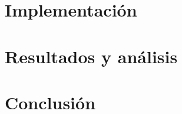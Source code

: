 \documentclass[12pt,a4]{article} %
\begin{document}
\begin{multicols}{2}
\section{Implementación}

\section{Resultados y análisis}

\section{Conclusión}


\appendix




\end{multicols}

\printbibliography
\end{document}
